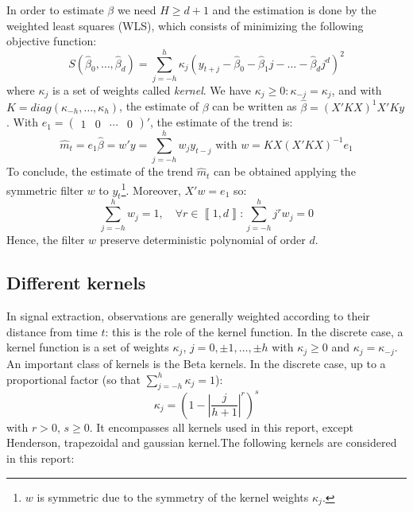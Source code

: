 \documentclass[
  12pt,
  ,
  a4paper]{article}
\newcommand\1{\mathds{1}}
\begin{document}
In order to estimate \(\beta\) we need \(H\geq d+1\) and the estimation is done by the weighted least squares (WLS), which consists of minimizing the following objective function:
\[
S(\hat{\beta}_{0},\dots,\hat{\beta}_{d})=\sum_{j=-h}^{h}\kappa_{j}(y_{t+j}-\hat{\beta}_{0}-\hat{\beta}_{1}j-\dots-\hat{\beta}_{d}j^{d})^{2}
\]
where \(\kappa_j\) is a set of weights called \emph{kernel}. We have \(\kappa_j\geq 0:\kappa_{-j}=\kappa_j\), and with \(K=diag(\kappa_{-h},\dots,\kappa_{h})\), the estimate of \(\beta\) can be written as \(\hat{\beta}=(X'KX)^{1}X'Ky\).
With \(e_{1}=\begin{pmatrix}1&0&\cdots&0\end{pmatrix}'\), the estimate of the trend is:
\[
\hat{m}_{t}=e_{1}\hat{\beta}=w'y=\sum_{j=-h}^{h}w_{j}y_{t-j}\text{ with }w=KX(X'KX)^{-1}e_{1}
\]
To conclude, the estimate of the trend \(\hat{m}_{t}\) can be obtained applying the symmetric filter \(w\) to \(y_t\)\footnote{\(w\) is symmetric due to the symmetry of the kernel weights \(\kappa_j\).}.
Moreover, \(X'w=e_{1}\) so:
\[
\sum_{j=-h}^{h}w_{j}=1,\quad\forall r\in\left\llbracket 1,d\right\rrbracket :\sum_{j=-h}^{h}j^{r}w_{j}=0
\]
Hence, the filter \(w\) preserve deterministic polynomial of order \(d\).

\hypertarget{sec:kernels}{%
\subsection{Different kernels}\label{sec:kernels}}

In signal extraction, observations are generally weighted according to their distance from time \(t\): this is the role of the kernel function.
In the discrete case, a kernel function is a set of weights \(\kappa_j\), \(j=0,\pm1,\dots,\pm h\) with \(\kappa_j \geq0\) and \(\kappa_j=\kappa_{-j}\).
An important class of kernels is the Beta kernels. In the discrete case, up to a proportional factor (so that \(\sum_{j=-h}^h\kappa_j=1\)):
\[
\kappa_j = \left(
  1-
  \left\lvert
  \frac j {h+1}
  \right\lvert^r
\right)^s
\]
with \(r>0\), \(s\geq 0\).
It encompasses all kernels used in this report, except Henderson, trapezoidal and gaussian kernel.The following kernels are considered in this report:
\end{document}
